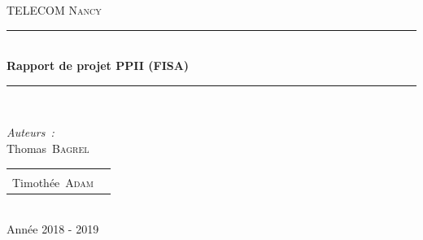 \documentclass[a4paper, 11pt, twoside]{book}
\newcommand{\HRule}{\rule{\linewidth}{0.5mm}}
\renewcommand{\tn}{TELECOM Nancy}
\begin{document}
\frontmatter
\pagestyle{empty}

\begin{titlepage}

\center{}


\hspace{0pt}
\vfill{}

\textsc{\large \tn{}}\\[1.2cm]


\HRule \\[0.4cm]
{ \huge \bfseries Rapport de projet PPII (FISA)}\\
\HRule \\[1.5cm]


\begin{minipage}{0.38\textwidth}
\begin{flushleft} \large
\emph{Auteurs~:}\\
Thomas~\textsc{Bagrel}
\end{flushleft}
\end{minipage}
\hfill
\begin{minipage}{0.58\textwidth}
\begin{flushright}
\begin{tabular}{lr}
\mbox{}\\
Timothée~\textsc{Adam}
\end{tabular}
\end{flushright}
\end{minipage}\\[1.5cm]


{\large Année 2018 - 2019}\\[1.2cm]


\end{titlepage}
\end{document}
